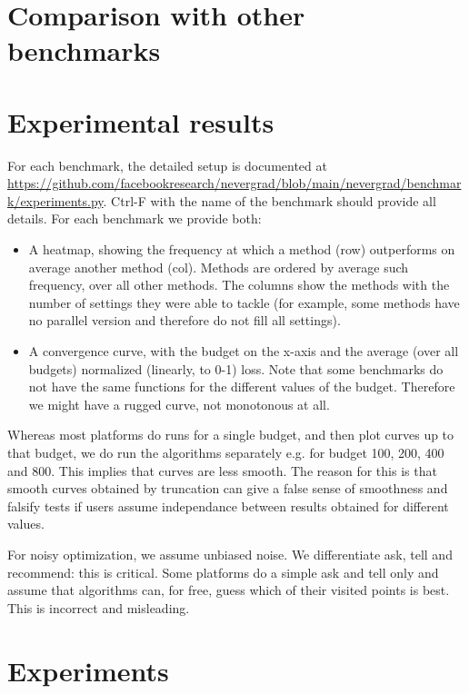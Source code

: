\documentclass{article}
\begin{document}
\section{Comparison with other benchmarks}

\section{Experimental results}

For each benchmark, the detailed setup is documented at \url{https://github.com/facebookresearch/nevergrad/blob/main/nevergrad/benchmark/experiments.py}.
Ctrl-F with the name of the benchmark should provide all details.
For each benchmark we provide both:
\begin{itemize}
\item A heatmap, showing the frequency at which a method (row) outperforms on average another method (col). Methods are ordered by average such frequency, over all other methods.
The columns show the methods with the number of settings they were able to tackle (for example, some methods have no parallel version and therefore do not fill all settings).
\item A convergence curve, with the budget on the x-axis and the average (over all budgets) normalized (linearly, to 0-1) loss. Note that some benchmarks do not have the same functions for the different values of the budget. Therefore we might have a rugged curve, not monotonous at all. 
\end{itemize}

Whereas most platforms do runs for a single budget, and then plot curves up to that budget, we do run the algorithms separately e.g. for budget 100, 200, 400 and 800. This implies that curves are less smooth. The reason for this is that smooth curves obtained by truncation can give a false sense of smoothness and falsify tests if users assume independance between results obtained for different values.

For noisy optimization, we assume unbiased noise.
We differentiate ask, tell and recommend: this is critical. Some platforms do a simple ask and tell only and assume that algorithms can, for free, guess which of their visited points is best. This is incorrect and misleading.

\section{Experiments}
\end{document}
